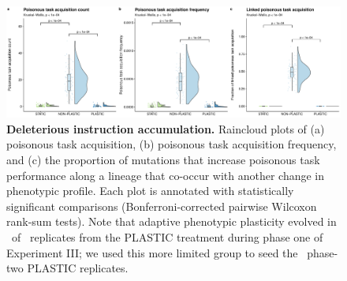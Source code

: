 \begin{figure}[ht!]
    \centering
    \includegraphics[width=1.0\textwidth]{media/poison-accumulation-panel.pdf}
    \caption{\small
    \textbf{Deleterious instruction accumulation.}
    Raincloud plots of 
    (a) poisonous task acquisition,
    (b) poisonous task acquisition frequency,
    and (c) the proportion of mutations that increase poisonous task performance along a lineage that co-occur with another change in phenotypic profile.
    Each plot is annotated with statistically significant comparisons (Bonferroni-corrected pairwise Wilcoxon rank-sum tests).
    Note that adaptive phenotypic plasticity evolved in \deleteriousHitchhikingPlasticReps\ of \deleteriousHitchhikingReplicates\ replicates from the PLASTIC treatment during phase one of Experiment III; we used this more limited group to seed the \deleteriousHitchhikingPlasticReps\ phase-two PLASTIC replicates.
    }
    \label{fig:deleterious-hitchhiking}
\end{figure}